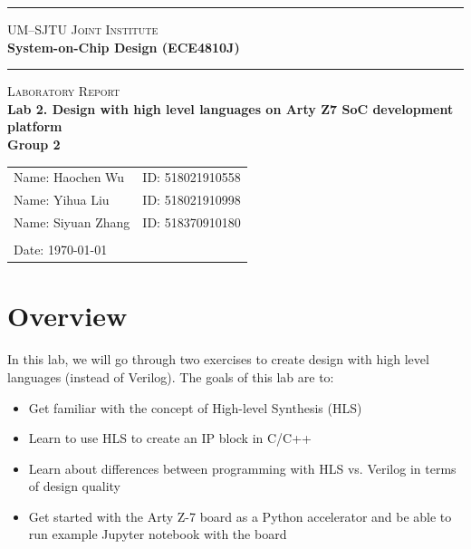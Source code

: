 \documentclass[a4paper]{article}
\begin{document}
\begin{titlepage}
    \vspace*{0.25cm}
    \noindent\rule[0.25\baselineskip]{\textwidth}{1pt}
    \begin{center}
        \huge{\textsc{UM--SJTU Joint Institute}}\vspace{0.3em}\\
        \huge{\textbf{System-on-Chip Design (ECE4810J)}}\vspace{0.3em}\\
        \noindent\rule[0.25\baselineskip]{\textwidth}{1pt}
    \end{center}
    \begin{center}
        \vspace{5cm}
        \Large{\textsc{Laboratory Report}}\vspace{0.5em}\\
        \Large{\textbf{Lab 2. Design with high level languages on Arty Z7 SoC development platform}}\vspace{1em}\\
        \Large{\textbf{Group 2}}\\
    \end{center}
    \vfill
    \large
    \begin{tabular}{ll}
        Name: Haochen Wu \hspace*{2em}&ID: 518021910558\hspace*{2em}\\
        Name: Yihua Liu \hspace*{2em}&ID: 518021910998\hspace*{2em}\\
        Name: Siyuan Zhang \hspace*{2em}&ID:
        518370910180 \hspace*{2em}\\
        \\
        Date: \today
    \end{tabular}
\end{titlepage}
\tableofcontents
\newpage
\section{Overview}
In this lab, we will go through two exercises to create design with high level languages (instead of Verilog). The goals of this lab are to:
\begin{itemize}
    \item Get familiar with the concept of High-level Synthesis (HLS)
    \item Learn to use HLS to create an IP block in C/C++
    \item Learn about differences between programming with HLS vs. Verilog in terms of design quality
    \item Get started with the Arty Z-7 board as a Python accelerator and be able to run example Jupyter notebook with the board
\end{itemize}
\end{document}
